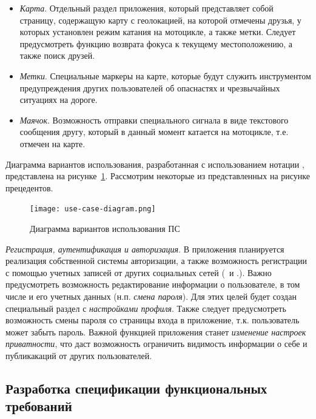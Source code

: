 \begin{itemize}
	\item \emph{Карта}. Отдельный раздел приложения, который представляет собой страницу, содержащую карту с геолокацией, на которой отмечены друзья, у которых установлен режим катания на мотоцикле, а также метки. Следует предусмотреть функцию возврата фокуса к текущему местоположению, а также поиск друзей.
	\item \emph{Метки}. Специальные маркеры на карте, которые будут служить инструментом предупреждения других пользователей об опаснастях и чрезвычайных ситуациях на дороге.
	\item \emph{Маячок}. Возможность отправки специального сигнала в виде текстового сообщения другу, который в данный момент катается на мотоцикле, т.е. отмечен на карте.
\end{itemize}

Диаграмма вариантов использования, разработанная с использованием нотации \uml, представлена на рисунке~\ref{fig:domain:model:use_cases:model}.
Рассмотрим некоторые из представленных на рисунке прецедентов.

\begin{figure}[H]
\centering
	\texttt{[image: use-case-diagram.png]}
	\caption{Диаграмма вариантов использования ПС}
	\label{fig:domain:model:use_cases:model}
\end{figure}

\emph{Регистрация, аутентификация и авторизация}. В приложения планируется реализация собственной системы авторизации, а также возможность регистрации с помощью учетных записей от других социальных сетей (\facebook~и \vk.).
Важно предусмотреть возможность редактирование информации о пользователе, в том числе и его учетных данных (н.п. \emph{смена пароля}). Для этих целей будет создан специальный раздел с \emph{настройками профиля}.
Также следует предусмотреть возможность смены пароля со страницы входа в приложение, т.к. пользователь может забыть пароль.
Важной функцией приложения станет \emph{изменение настроек приватности}, что даст возможность ограничить видимость информации о себе и публикакаций от других пользователей. 

\subsection{Разработка спецификации функциональных требований}
\label{sec:domain:specification}

